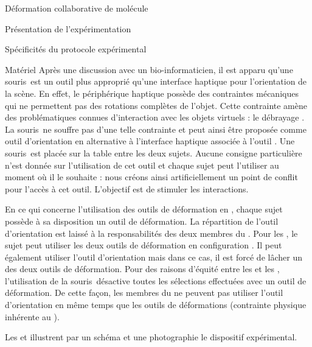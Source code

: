 \documentclass[myfrancais,ngerman,english,frenchb]{mythesis}
\begin{document}
\begin{mychapter}{Déformation collaborative de molécule}
\begin{mysection}{Présentation de l'expérimentation}
\begin{mysubsection}{Spécificités du protocole expérimental}
\begin{mysubsubsection}{Matériel}
					Après une discussion avec un bio-informaticien, il est apparu qu'une souris~\myThreeD est un outil plus approprié qu'une interface haptique pour l'orientation de la scène.
					En effet, le périphérique haptique possède des contraintes mécaniques qui ne permettent pas des rotations complètes de l'objet.
					Cette contrainte amène des problématiques connues d'interaction avec les objets virtuels : le débrayage .
					La souris~\myThreeD ne souffre pas d'une telle contrainte et peut ainsi être proposée comme outil d'orientation en alternative à l'interface haptique associée à l'outil .
					Une souris~\myThreeD \mySpaceNavigator est placée sur la table entre les deux sujets.
					Aucune consigne particulière n'est donnée sur l'utilisation de cet outil et chaque sujet peut l'utiliser au moment où il le souhaite : nous créons ainsi artificiellement un point de conflit pour l'accès à cet outil.
					L'objectif est de stimuler les interactions.

					En ce qui concerne l'utilisation des outils de déformation en , chaque sujet possède à sa disposition un outil de déformation.
					La répartition de l'outil d'orientation est laissé à la responsabilités des deux membres du .
					Pour les , le sujet peut utiliser les deux outils de déformation en configuration .
					Il peut également utiliser l'outil d'orientation mais dans ce cas, il est forcé de lâcher un des deux outils de déformation.
					Pour des raisons d'équité entre les  et les , l'utilisation de la souris~\myThreeD désactive toutes les sélections effectuées avec un outil de déformation.
					De cette façon, les membres du  ne peuvent pas utiliser l'outil d'orientation en même temps que les outils de déformations (contrainte physique inhérente au ).

					Les  et  illustrent par un schéma et une photographie le dispositif expérimental.


\end{mysubsubsection}
\end{mysubsection}
\end{mysection}
\end{mychapter}
\end{document}

